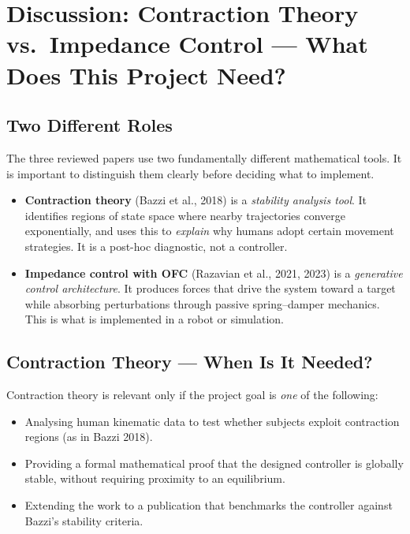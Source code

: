 \documentclass[11pt]{article}
\begin{document}
\section{Discussion: Contraction Theory vs.\ Impedance Control --- What Does This Project Need?}

\subsection*{Two Different Roles}

The three reviewed papers use two fundamentally different mathematical tools.
It is important to distinguish them clearly before deciding what to implement.

\begin{itemize}
    \item \textbf{Contraction theory} (Bazzi et al., 2018) is a \emph{stability analysis tool}.
          It identifies regions of state space where nearby trajectories converge
          exponentially, and uses this to \emph{explain} why humans adopt certain
          movement strategies.  It is a post-hoc diagnostic, not a controller.

    \item \textbf{Impedance control with OFC} (Razavian et al., 2021, 2023) is a
          \emph{generative control architecture}.  It produces forces that drive the
          system toward a target while absorbing perturbations through passive
          spring--damper mechanics.  This is what is implemented in a robot or simulation.
\end{itemize}

\subsection*{Contraction Theory --- When Is It Needed?}

Contraction theory is relevant only if the project goal is \emph{one} of the following:

\begin{itemize}
    \item Analysing human kinematic data to test whether subjects exploit contraction
          regions (as in Bazzi 2018).
    \item Providing a formal mathematical proof that the designed controller is
          globally stable, without requiring proximity to an equilibrium.
    \item Extending the work to a publication that benchmarks the controller against
          Bazzi's stability criteria.
\end{itemize}
\end{document}
